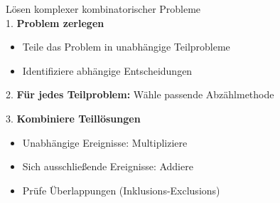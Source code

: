 \begin{KR}{Lösen komplexer kombinatorischer Probleme}\\
1. \textbf{Problem zerlegen}
   \begin{itemize}
   \item Teile das Problem in unabhängige Teilprobleme
   \item Identifiziere abhängige Entscheidungen
   \end{itemize}

2. \textbf{Für jedes Teilproblem:} Wähle passende Abzählmethode

3. \textbf{Kombiniere Teillösungen}
   \begin{itemize}
   \item Unabhängige Ereignisse: Multipliziere
   \item Sich ausschließende Ereignisse: Addiere
   \item Prüfe Überlappungen (Inklusions-Exclusions)
   \end{itemize}
\end{KR}



